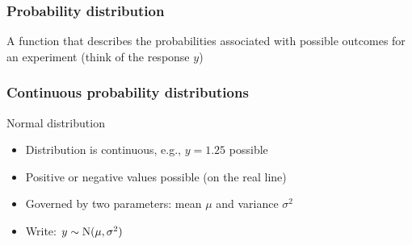 \documentclass[dvipsnames]{beamer}
\begin{document}
\begin{frame}
 \frametitle{Probability distribution}
 A function that describes the probabilities associated with possible outcomes for an experiment (think of the response $y$)
\end{frame}

\begin{frame}
 \frametitle{Continuous probability distributions}
 \begin{center}
 \textcolor{atugreen}{Normal distribution}
 \end{center}

 \begin{itemize}
  \item<only@2> Distribution is continuous, e.g., $y = 1.25$ possible
  \item Positive or negative values possible (on the real line)
  \item Governed by two parameters: mean $\mu$ and variance $\sigma^2$
  \item Write: $y \sim \textnormal{N}(\mu, \sigma^2)$
 \end{itemize}
\end{frame}
\end{document}
